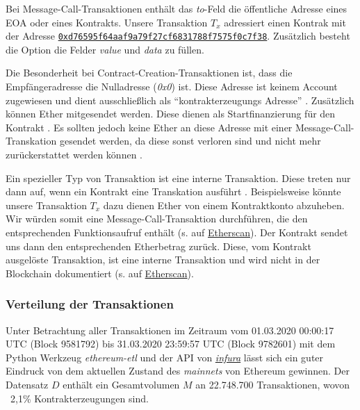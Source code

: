 \documentclass[runningheads]{llncs}
\begin{document}
Bei Message-Call-Transaktionen enthält das \textit{to}-Feld die öffentliche Adresse eines EOA oder eines Kontrakts. Unsere Transaktion $T_x$ adressiert einen Kontrak mit der Adresse \href{https://ropsten.etherscan.io/address/0xd76595f64aaf9a79f27cf6831788f7575f0c7f38}{\texttt{0xd76595f64aaf9a79f27cf6831788f7575f0c7f38}}. Zusätzlich besteht die Option die Felder \textit{value} und \textit{data} zu füllen. 

Die Besonderheit bei Contract-Creation-Transaktionen ist, dass die Empfängeradresse die Nulladresse (\textit{0x0}) ist. Diese Adresse ist keinem Account zugewiesen und dient ausschließlich als "`kontrakterzeugungs Adresse"' \cite{antonopoulos_mastering_2019}. Zusätzlich können Ether mitgesendet werden. Diese dienen als Startfinanzierung für den Kontrakt \cite[S. 4]{wood_ethereum/yellowpaper_2019}. Es sollten jedoch keine Ether an diese Adresse mit einer Message-Call-Transkation gesendet werden, da diese sonst verloren sind und nicht mehr zurückerstattet werden können \cite[S. 112]{antonopoulos_mastering_2019}.

Ein spezieller Typ von Transaktion ist eine interne Transaktion. Diese treten nur dann auf, wenn ein Kontrakt eine Transkation ausführt \cite[S. 40]{antonopoulos_mastering_2019}. Beispielsweise könnte unsere Transaktion $T_x$ dazu dienen Ether von einem Kontraktkonto abzuheben. Wir würden somit eine Message-Call-Transaktion durchführen, die den entsprechenden Funktionsaufruf enthält (s. auf \href{https://ropsten.etherscan.io/tx/0xeb5022156e0fa4fdd2ff7045b59b9a3d90317f6e4a15f91a5aa044c8a645d7cb}{Etherscan}). Der Kontrakt sendet uns dann den entsprechenden Etherbetrag zurück. Diese, vom Kontrakt ausgelöste Transaktion, ist eine interne Transaktion und wird nicht in der Blockchain dokumentiert (s. auf \href{https://ropsten.etherscan.io/tx/0xeb5022156e0fa4fdd2ff7045b59b9a3d90317f6e4a15f91a5aa044c8a645d7cb#internal}{Etherscan}).

\subsubsection{Verteilung der Transaktionen}
Unter Betrachtung aller Transaktionen im Zeitraum vom 01.03.2020 00:00:17 UTC (Block 9581792) bis 31.03.2020 23:59:57 UTC (Block 9782601) mit dem Python Werkzeug \textit{ethereum-etl} \cite{noauthor_blockchain-etl/ethereum-etl_2020} und der API von \href{https://infura.io/}{\textit{infura}} lässt sich ein guter Eindruck von dem aktuellen Zustand des \textit{mainnets} von Ethereum gewinnen. Der Datensatz $ D $ enthält ein Gesamtvolumen $ M $ an 22.748.700 Transaktionen, wovon ~2,1\% Kontrakterzeugungen sind. 
\end{document}

